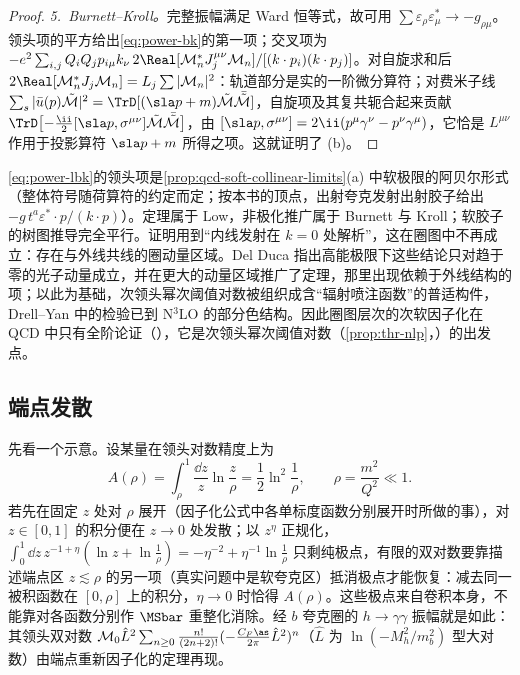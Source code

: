 \begin{proof}
\emph{5.~Burnett--Kroll。}完整振幅满足 Ward 恒等式，故可用 $\sum\varepsilon_\rho\varepsilon^*_\mu\to-g_{\rho\mu}$。领头项的平方给出\eqref{eq:power-bk}的第一项；交叉项为 $-e^2\sum_{i,j}Q_iQ_jp_{i\mu}k_\nu\,2\Real[\mathcal M_n^*J_j^{\mu\nu}\mathcal M_n]/[(k\cdot p_i)(k\cdot p_j)]$。对自旋求和后 $2\Real[\mathcal M_n^*J_j\mathcal M_n]=L_j\sum|\mathcal M_n|^2$：轨道部分是实的一阶微分算符；对费米子线 $\sum_s|\bar u(p)\tilde{\mathcal M}|^2=\TrD[(\sla p+m)\tilde{\mathcal M}\bar{\tilde{\mathcal M}}]$，自旋项及其复共轭合起来贡献 $\TrD\big[{-\frac{\ii}{2}}[\sla p,\sigma^{\mu\nu}]\tilde{\mathcal M}\bar{\tilde{\mathcal M}}\big]$，由 $[\sla p,\sigma^{\mu\nu}]=2\ii(p^\mu\gamma^\nu-p^\nu\gamma^\mu)$，它恰是 $L^{\mu\nu}$ 作用于投影算符 $\sla p+m$ 所得之项。这就证明了 (b)。
\end{proof}

\eqref{eq:power-lbk}的领头项是\cref{prop:qcd-soft-collinear-limits}(a) 中软极限的阿贝尔形式（整体符号随荷算符的约定而定；按本书的顶点，出射夸克发射出射胶子给出 $-g\,t^a\varepsilon^*\!\cdot p/(k\cdot p)$）。定理属于 Low\cite{Low1958}，非极化推广属于 Burnett 与 Kroll\cite{BurnettKroll1968}；软胶子的树图推导完全平行。证明用到“内线发射在 $k=0$ 处解析”，这在圈图中不再成立：存在与外线共线的圈动量区域。Del Duca 指出高能极限下这些结论只对趋于零的光子动量成立，并在更大的动量区域推广了定理，那里出现依赖于外线结构的项\cite{DelDuca1990}；以此为基础，次领头幂次阈值对数被组织成含“辐射喷注函数”的普适构件\cite{Bonocore:2015esa,Bonocore:2016awd}，Drell--Yan 中的检验已到 N$^3$LO 的部分色结构\cite{Bahjat-Abbas:2018hpv}。因此圈图层次的次软因子化在 QCD 中只有全阶论证（\tagA），它是次领头幂次阈值对数（\cref{prop:thr-nlp}，\tagP）的出发点。

\subsection{端点发散}

先看一个示意。设某量在领头对数精度上为
\begin{equation}\label{eq:power-endpoint-toy}
A(\rho)=\int_\rho^1\frac{\dd z}{z}\ln\frac{z}{\rho}=\frac12\ln^2\frac1\rho,\qquad\rho=\frac{m^2}{Q^2}\ll1 .
\end{equation}
若先在固定 $z$ 处对 $\rho$ 展开（因子化公式中各单标度函数分别展开时所做的事），对 $z\in[0,1]$ 的积分便在 $z\to0$ 处发散；以 $z^\eta$ 正规化，$\int_0^1\dd z\,z^{-1+\eta}(\ln z+\ln\frac1\rho)=-\eta^{-2}+\eta^{-1}\ln\frac1\rho$ 只剩纯极点，有限的双对数要靠描述端点区 $z\lesssim\rho$ 的另一项（真实问题中是软夸克区）抵消极点才能恢复：减去同一被积函数在 $[0,\rho]$ 上的积分，$\eta\to0$ 时恰得 $A(\rho)$。这些极点来自卷积本身，不能靠对各函数分别作 $\MSbar$ 重整化消除。经 $b$ 夸克圈的 $h\to\gamma\gamma$ 振幅就是如此：其领头双对数 $\mathcal M_0\hat L^2\sum_{n\ge0}\frac{n!}{(2n+2)!}(-\frac{C_F\as}{2\pi}\hat L^2)^n$（$\hat L$ 为 $\ln(-M_h^2/m_b^2)$ 型大对数）由端点重新因子化的定理再现\cite{Liu:2019oav,Liu:2020wbn}。%

